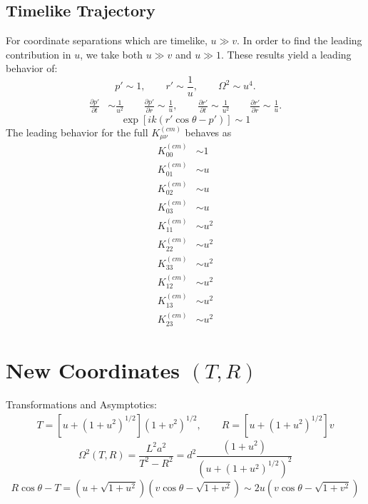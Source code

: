 \documentclass[10pt,letterpaper]{article}
\begin{document}
\subsection*{Timelike Trajectory}
For coordinate separations which are timelike, $u\gg v$. In order to find the leading contribution in $u$, we take both $u\gg v$ and $u\gg1$. These results yield a leading behavior of:
\begin{equation}
p'\sim 1,\qquad r'\sim \frac{1}{u},\qquad \Omega^2\sim u^4. 
\end{equation}
\begin{align}
\frac{\partial p'}{\partial t} & \sim  \frac{1}{u^2}\qquad
\frac{\partial p'}{\partial r}  \sim 	\frac{1}{u},\qquad
\frac{\partial r'}{\partial t}  \sim \frac{1}{u^2}\qquad
\frac{\partial r'}{\partial r}  \sim  \frac{1}{u}.
\end{align}
\begin{equation}
\exp[{ik(r'\cos\theta-p')} ]\sim 1
\end{equation}
The leading behavior for the full $K_{\mu\nu}^{(cm)}$ behaves as
\begin{align}
K^{(cm)}_{00} &\sim 1 \nonumber\\
K^{(cm)}_{01} &\sim  u\nonumber\\
K^{(cm)}_{02} &\sim  u\nonumber\\
K^{(cm)}_{03} &\sim   u\nonumber\\
K^{(cm)}_{11} &\sim  u^2\nonumber\\
K^{(cm)}_{22} &\sim  u^2\nonumber\\
K^{(cm)}_{33} &\sim  u^2\nonumber\\
K^{(cm)}_{12} &\sim u^2\nonumber\\
K^{(cm)}_{13} &\sim u^2\nonumber\\
K^{(cm)}_{23} &\sim u^2
\end{align}
\section*{New Coordinates $(T,R)$}
Transformations and Asymptotics:
\begin{align}
T = \left[u+(1+u^2)^{1/2}\right]( 1+v^2)^{1/2},\qquad R = \left[u+(1+u^2)^{1/2}\right]v
\end{align}
\begin{equation}
\Omega^2(T,R) = \frac{L^2 a^2}{T^2-R^2} = d^2\frac{(1+u^2)}{(u+(1+u^2)^{1/2})^2}
\end{equation}
\begin{equation}
R\cos\theta - T = (u+\sqrt{1+u^2})(v\cos\theta - \sqrt{1+v^2}) \sim 2u(v\cos\theta-\sqrt{1+v^2})
\end{equation}
\end{document}
